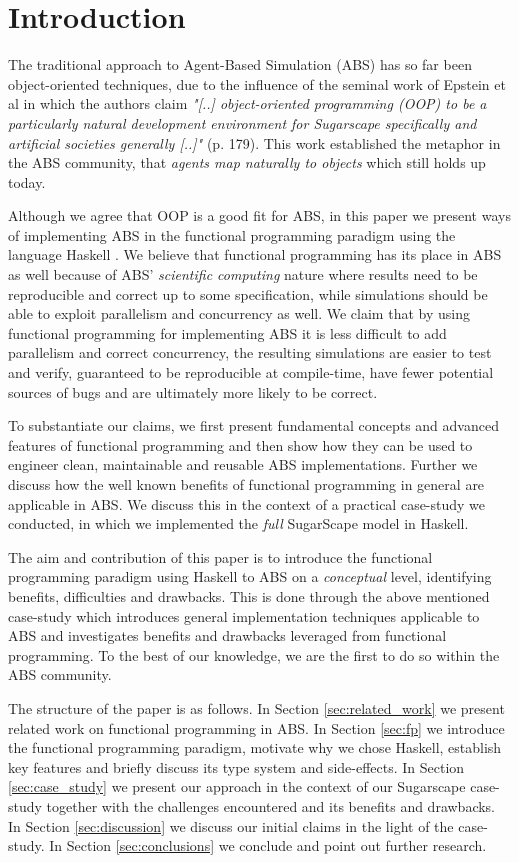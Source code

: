 \section{Introduction}
The traditional approach to Agent-Based Simulation (ABS) has so far been object-oriented techniques, due to the influence of the seminal work of Epstein et al \cite{epstein_growing_1996} in which the authors claim \textit{"[..] object-oriented programming (OOP) to be a particularly natural development environment for Sugarscape specifically and artificial societies generally [..]"} (p. 179). This work established the metaphor in the ABS community, that \textit{agents map naturally to objects} \cite{north_managing_2007} which still holds up today. 

Although we agree that OOP is a good fit for ABS, in this paper we present ways of implementing ABS in the functional programming paradigm using the language Haskell \cite{hudak_history_2007}. We believe that functional programming has its place in ABS as well because of ABS' \textit{scientific computing} nature where results need to be reproducible and correct up to some specification, while simulations should be able to exploit parallelism and concurrency as well. 
We claim that by using functional programming for implementing ABS it is less difficult to add parallelism and correct concurrency, the resulting simulations are easier to test and verify, guaranteed to be reproducible at compile-time, have fewer potential sources of bugs \cite{vipindeep_list_2005} and are ultimately more likely to be correct. 

To substantiate our claims, we first present fundamental concepts and advanced features of functional programming and then show how they can be used to engineer clean, maintainable and reusable ABS implementations. Further we discuss how the well known benefits of functional programming in general are applicable in ABS. We discuss this in the context of a practical case-study we conducted, in which we implemented the \textit{full} SugarScape model \cite{epstein_growing_1996} in Haskell. 

The aim and contribution of this paper is to introduce the functional programming paradigm using Haskell to ABS on a \textit{conceptual} level, identifying benefits, difficulties and drawbacks. This is done through the above mentioned case-study which introduces general implementation techniques applicable to ABS and investigates benefits and drawbacks leveraged from functional programming. To the best of our knowledge, we are the first to do so within the ABS community.

The structure of the paper is as follows. 
In Section \ref{sec:related_work} we present related work on functional programming in ABS. 
In Section \ref{sec:fp} we introduce the functional programming paradigm, motivate why we chose Haskell, establish key features and briefly discuss its type system and side-effects. 
In Section \ref{sec:case_study} we present our approach in the context of our Sugarscape case-study together with the challenges encountered and its benefits and drawbacks.
In Section \ref{sec:discussion} we discuss our initial claims in the light of the case-study.
In Section \ref{sec:conclusions} we conclude and point out further research.